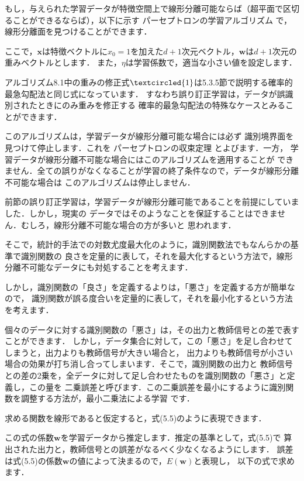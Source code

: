 もし，与えられた学習データが特徴空間上で線形分離可能ならば（超平面で区切ることができるならば），以下に示す
パーセプトロンの学習アルゴリズム
で，線形分離面を見つけることができます．


ここで，$\bm{x}$は特徴ベクトルに$x_0=1$を加えた$d+1$次元ベクトル，$\bm{w}$は$d+1$次元の重みベクトルとします．
また，$\eta$は学習係数で，適当な小さい値を設定します．


アルゴリズム8.1中の重みの修正式$ \textcircled{1}$は5.3.5節で説明する確率的最急勾配法と同じ式になっています．
すなわち誤り訂正学習は，データが誤識別されたときにのみ重みを修正する
確率的最急勾配法の特殊なケースとみることができます．


このアルゴリズムは，学習データが線形分離可能な場合には必ず
識別境界面を見つけて停止します．これを
パーセプトロンの収束定理
とよびます．一方，
学習データが線形分離不可能な場合にはこのアルゴリズムを適用することが
できません．全ての誤りがなくなることが学習の終了条件なので，データが線形分離不可能な場合は
このアルゴリズムは停止しません．


前節の誤り訂正学習は，学習データが線形分離可能であることを前提にしていました．しかし，現実の
データではそのようなことを保証することはできません．むしろ，線形分離不可能な場合の方が多いと
思われます．

そこで，統計的手法での対数尤度最大化のように，識別関数法でもなんらかの基準で識別関数の
良さを定量的に表して，それを最大化するという方法で，線形分離不可能なデータにも対処することを考えます．

しかし，識別関数の「良さ」を定義するよりは，「悪さ」を定義する方が簡単なので，
識別関数が誤る度合いを定量的に表して，それを最小化するという方法を考えます．

個々のデータに対する識別関数の「悪さ」は，その出力と教師信号との差で表すことができます．
しかし，データ集合に対して，この「悪さ」を足し合わせてしまうと，出力よりも教師信号が大きい場合と，
出力よりも教師信号が小さい場合の効果が打ち消し合ってしまいます．そこで，識別関数の出力と
教師信号との差の2乗を，全データに対して足し合わせたものを識別関数の「悪さ」と定義し，この量を
二乗誤差と呼びます．この二乗誤差を最小にするように識別関数を調整する方法が，最小二乗法による学習
です．


求める関数を線形であると仮定すると，式(5.5)のように表現できます．

この式の係数$\bm{w}$を学習データから推定します．推定の基準として，式(5.5)で
算出された出力と，教師信号との誤差がなるべく少なくなるようにします．
誤差は式(5.5)の係数$\bm{w}$の値によって決まるので，$E(\bm{w})$と表現し，
以下の式で求めます．

